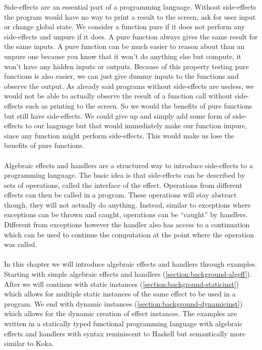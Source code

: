 Side-effects are an essential part of a programming language. Without side-effects the program would have no way to print a result to the screen, ask for user input or change global state. We consider a function pure if it does not perform any side-effects and unpure if it does. A pure function always gives the same result for the same inputs. A pure function can be much easier to reason about than an unpure one because you know that it won't do anything else but compute, it won't have any hidden inputs or outputs. Because of this property testing pure functions is also easier, we can just give dummy inputs to the functions and observe the output. As already said programs without side-effects are useless, we would not be able to actually observe the result of a function call without side-effects such as printing to the screen. So we would the benefits of pure functions but still have side-effects. We could give up and simply add some form of side-effects to our language but that would immediately make our function impure, since any function might perform side-effects. This would make us lose the benefits of pure functions.
\\\\
Algebraic effects and handlers are a structured way to introduce side-effects to a programming language.
The basic idea is that side-effects can be described by sets of operations, called the interface of the effect.
Operations from different effects can then be called in a program.
These operations will stay abstract though, they will not actually do anything.
Instead, similar to exceptions where exceptions can be thrown and caught, operations can be ``caught'' by handlers.
Different from exceptions however the handler also has access to a continuation which can be used to continue the computation at the point where the operation was called.
\\\\
In this chapter we will introduce algebraic effects and handlers through examples.
Starting with simple algebraic effects and handlers (\cref{section:background-algeff}).
After we will continue with static instances (\cref{section:background-staticinst}) which allows for multiple static instances of the same effect to be used in a program.
We end with dynamic instances (\cref{section:background-dynamicinst}) which allows for the dynamic creation of effect instances. The examples are written in a statically typed functional programming language with algebraic effects and handlers with syntax reminiscent to Haskell but semantically more similar to Koka\cite{koka2}.

